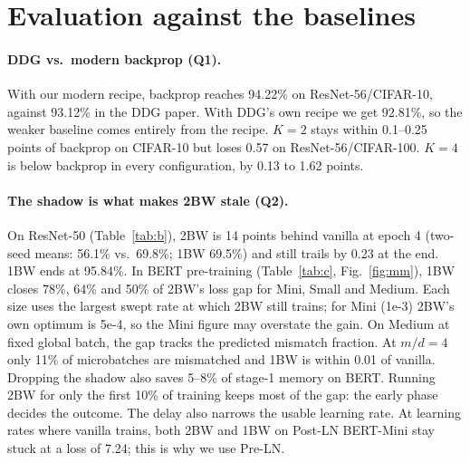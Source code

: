 \documentclass[10pt,twocolumn]{article}
\begin{document}
\section{Evaluation against the baselines}
\paragraph{DDG vs.\ modern backprop (Q1).} With our modern recipe, backprop reaches 94.22\%
on ResNet-56/CIFAR-10, against 93.12\% in the DDG paper. With DDG's own recipe we get 92.81\%,
so the weaker baseline comes entirely from the recipe. $K{=}2$ stays within 0.1--0.25 points
of backprop on CIFAR-10 but loses 0.57 on ResNet-56/CIFAR-100. $K{=}4$ is below backprop in
every configuration, by 0.13 to 1.62 points.

\paragraph{The shadow is what makes 2BW stale (Q2).} On ResNet-50 (Table~\ref{tab:b}), 2BW
is 14 points behind vanilla at epoch 4 (two-seed means: 56.1\% vs.\ 69.8\%; 1BW 69.5\%) and
still trails by 0.23 at the end. 1BW ends at 95.84\%. In BERT pre-training (Table~\ref{tab:c},
Fig.~\ref{fig:mm}), 1BW closes 78\%, 64\% and 50\% of 2BW's loss gap for Mini, Small and
Medium. Each size uses the largest swept rate at which 2BW still trains; for Mini (1e-3) 2BW's
own optimum is 5e-4, so the Mini figure may overstate the gain. On Medium at fixed global batch, the gap tracks the predicted mismatch fraction. At
$m/d{=}4$ only 11\% of microbatches are mismatched and 1BW is within 0.01 of vanilla. Dropping
the shadow also saves 5--8\% of stage-1 memory on BERT. Running 2BW for only the first 10\% of
training keeps most of the gap: the early phase decides the outcome.
The delay also narrows the usable learning rate. At learning rates where vanilla trains, both
2BW and 1BW on Post-LN BERT-Mini stay stuck at a loss of 7.24; this is why we use Pre-LN.
\end{document}
